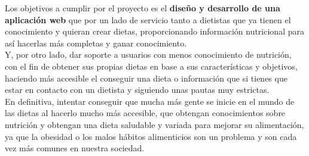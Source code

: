 Los objetivos a cumplir por el proyecto es el \textbf{diseño y desarrollo de una aplicación web} que por un lado de servicio tanto a dietistas
que ya tienen el conocimiento y quieran crear dietas, proporcionando información nutricional para así hacerlas más completas y ganar 
conocimiento.\\

Y, por otro lado, dar soporte a usuarios con menos conocimiento de nutrición, con el fin de obtener sus propias dietas en base a sus características y objetivos,
haciendo más accesible el conseguir una dieta o información que si tienes que estar en contacto con un dietista y siguiendo unas pautas muy estrictas.\\

En definitiva, intentar conseguir que mucha más gente se inicie en el mundo de las dietas al hacerlo mucho 
más accesible, que obtengan conocimientos sobre nutrición y obtengan una dieta saludable y variada para mejorar su alimentación,
ya que la obesidad o los malos hábitos alimenticios son un problema y son cada vez más comunes en nuestra sociedad.
